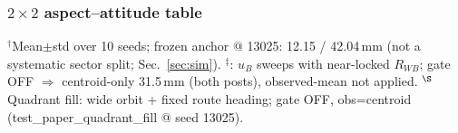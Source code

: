 \subsubsection{$2\times2$ aspect--attitude table}
\begin{table}[!t]
  \centering
  \caption{Degeneracy table: $u_B$ sweep vs.\ POI-lock $\times$ $R_{WB}$ diversity (simulation).}
  \label{tab:degeneracy_2x2}
  \footnotesize
  \vspace{1mm}

  {\footnotesize $^\dagger$Mean$\pm$std over 10 seeds; frozen anchor @ 13025: 12.15 / 42.04\,mm
  (not a systematic sector split; Sec.~\ref{sec:sim}).
  $^\ddagger$\flightJ{}: $u_B$ sweeps with near-locked $R_{WB}$; gate OFF
  $\Rightarrow$ centroid-only 31.5\,mm (both posts), observed-mean not applied.
  $^\S$Quadrant fill: wide orbit + fixed route heading; gate OFF, obs=centroid
  (test\_paper\_quadrant\_fill @ seed 13025).}
\end{table}

